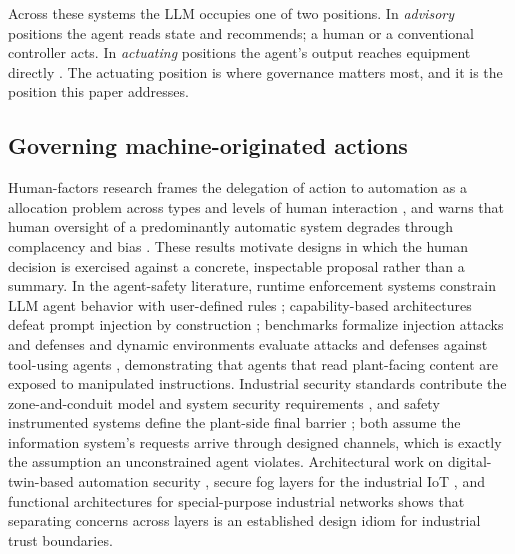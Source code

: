 Across these systems the LLM occupies one of two positions. In
\emph{advisory} positions the agent reads state and recommends; a human or a
conventional controller acts. In \emph{actuating} positions the agent's
output reaches equipment directly \cite{waseem2026pretrained,
xia2025control,koehle2026llmdriven,hofmann2025nlc}. The actuating position is
where governance matters most, and it is the position this paper addresses.

\subsection{Governing machine-originated actions}
\label{sec:related-gov}

Human-factors research frames the delegation of action to automation as a
allocation problem across types and levels of human interaction
\cite{parasuraman2000model}, and warns that human oversight of a
predominantly automatic system degrades through complacency and bias
\cite{parasuramanmanzey2010complacency,bainbridge1983ironies}. These
results motivate designs in which the human decision is exercised against a
concrete, inspectable proposal rather than a summary. In the agent-safety
literature, runtime enforcement systems constrain LLM agent behavior with
user-defined rules \cite{wang2025agentspec}; capability-based architectures
defeat prompt injection by construction \cite{debenedetti2025camel};
benchmarks formalize injection attacks and defenses
\cite{liu2024pinjection,zhan2024injecagent} and dynamic environments
evaluate attacks and defenses against tool-using agents
\cite{debenedetti2024agentdojo}, demonstrating that agents that read
plant-facing content are exposed to manipulated instructions. Industrial
security standards contribute the zone-and-conduit model
\cite{iec62443-3-2} and system security requirements
\cite{iec62443-3-3}, and safety instrumented systems define the
plant-side final barrier \cite{iec61511}; both assume the information
system's requests arrive through designed channels, which is exactly the
assumption an unconstrained agent violates. Architectural work on
digital-twin-based automation security \cite{gehrmann2020dtiacs}, secure
fog layers for the industrial IoT \cite{sengupta2021securefog}, and
functional architectures for special-purpose industrial networks
\cite{mahmood2023functional} shows that separating concerns across layers
is an established design idiom for industrial trust boundaries.

